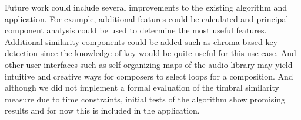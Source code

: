 \documentclass{article}
\begin{document}
Future work could include several improvements to the existing algorithm and application. For example, additional features could be calculated and principal component analysis could be used to determine the most useful features. Additional similarity components could be added such as chroma-based key detection since the knowledge of key would be quite useful for this use case. And other user interfaces such as self-organizing maps of the audio library may yield intuitive and creative ways for composers to select loops for a composition. And although we did not implement a formal evaluation of the timbral similarity measure due to time constraints, initial tests of the algorithm show promising results and for now this is included in the application.




%
%
%



\vfill\pagebreak


%

\end{document}
